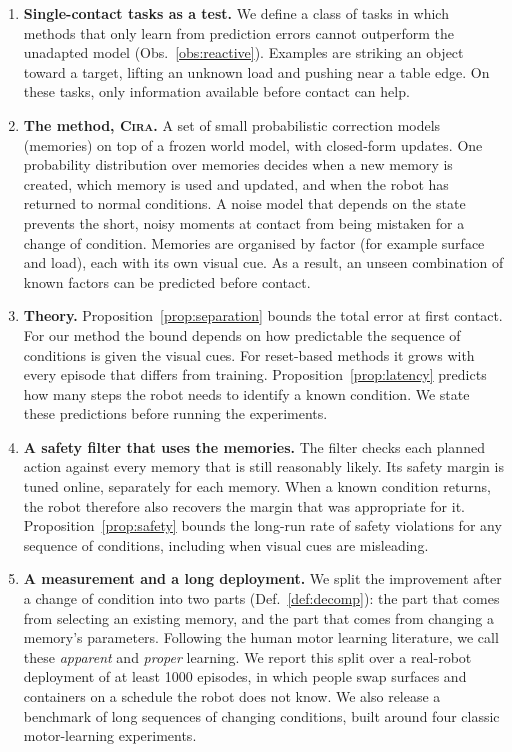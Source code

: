\documentclass[10pt]{article}
\newcommand{\method}{\textsc{Cira}}
\begin{document}
\begin{enumerate}[label=\textbf{C\arabic*.},leftmargin=2.2em]
  \item \textbf{Single-contact tasks as a test.} We define a class of tasks in which methods that only
  learn from prediction errors cannot outperform the unadapted model (Obs.~\ref{obs:reactive}).
  Examples are striking an object toward a target, lifting an unknown load and pushing near a table
  edge. On these tasks, only information available before contact can help.
  \item \textbf{The method, \method{}.} A set of small probabilistic correction models (memories) on
  top of a frozen world model, with closed-form updates. One probability distribution over memories
  decides when a new memory is created, which memory is used and updated, and when the robot has
  returned to normal conditions. A noise model that depends on the state prevents the short, noisy
  moments at contact from being mistaken for a change of condition. Memories are organised by factor
  (for example surface and load), each with its own visual cue. As a result, an unseen combination of
  known factors can be predicted before contact.
  \item \textbf{Theory.} Proposition~\ref{prop:separation} bounds the total error at first contact.
  For our method the bound depends on how predictable the sequence of conditions is given the visual
  cues. For reset-based methods it grows with every episode that differs from training.
  Proposition~\ref{prop:latency} predicts how many steps the robot needs to identify a known
  condition. We state these predictions before running the experiments.
  \item \textbf{A safety filter that uses the memories.} The filter checks each planned action against
  every memory that is still reasonably likely. Its safety margin is tuned online, separately for each
  memory. When a known condition returns, the robot therefore also recovers the margin that was
  appropriate for it. Proposition~\ref{prop:safety} bounds the long-run rate of safety violations for
  any sequence of conditions, including when visual cues are misleading.
  \item \textbf{A measurement and a long deployment.} We split the improvement after a change of
  condition into two parts (Def.~\ref{def:decomp}): the part that comes from selecting an existing
  memory, and the part that comes from changing a memory's parameters. Following the human motor
  learning literature, we call these \emph{apparent} and \emph{proper} learning. We report this split
  over a real-robot deployment of at least 1000 episodes, in which people swap surfaces and containers
  on a schedule the robot does not know. We also release a benchmark of long sequences of changing
  conditions, built around four classic motor-learning experiments.
\end{enumerate}
\end{document}
